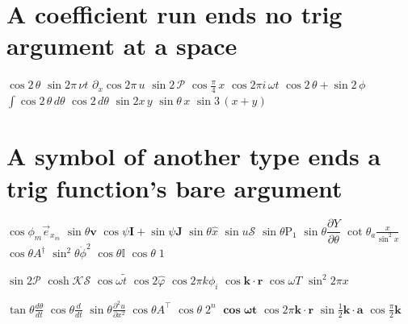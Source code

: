 \documentclass{article}
\begin{document}
\section{A coefficient run ends no trig argument at a space}
$\cos 2\,\theta$ $\sin 2\pi\,\nu t$ $\partial_x\cos 2\pi\,u$ $\sin 2\,\mathcal P$ $\cos\frac{\pi}{4}\,x$ $\cos 2\pi i\,\omega t$
$\cos 2\,\theta+\sin 2\,\phi$ $\int\cos 2\,\theta\,d\theta$ $\cos 2\,d\theta$ $\sin 2x\,y$ $\sin\theta\,x$ $\sin 3\,(x+y)$

\section{A symbol of another type ends a trig function's bare argument}
$\cos\phi_m\vec{e}_{x_m}$ $\sin\theta\mathbf{v}$ $\cos\psi\mathbf{I}+\sin\psi\mathbf{J}$ $\sin\theta\hat{x}$
$\sin u\mathcal{S}$ $\sin\theta\mathrm{P}_1$ $\sin\theta\dfrac{\partial Y}{\partial\theta}$ $\cot\theta_a\frac{x}{\sin^2 x}$
$\cos\theta A^\dagger$ $\sin^2\theta\dot\phi^2$ $\cos\theta\mathbb{I}$ $\cos\theta\;1$

$\sin 2\mathcal{P}$ $\cosh\mathcal{K}\mathcal{S}$ $\cos\omega\tilde{t}$ $\cos 2\hat\varphi$ $\cos 2\pi k\phi_i$
$\cos\mathbf{k}\cdot\mathbf{r}$ $\cos\omega T$ $\sin^2 2\pi x$

$\tan\theta\frac{d\theta}{dt}$ $\cos\theta\frac{d}{dt}$ $\sin\theta\frac{\partial^2 u}{\partial x^2}$ $\cos\theta A^\top$
$\cos\theta\;2^n$ $\mathbf{\cos\omega t}$ $\cos 2\pi\mathbf{k}\cdot\mathbf{r}$ $\sin\frac12\mathbf{k}\cdot\mathbf{a}$ $\cos\frac{\pi}{2}\mathbf{k}$
\end{document}
